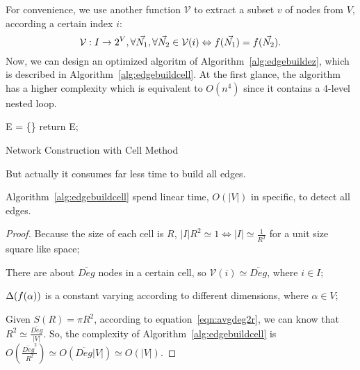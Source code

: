 \documentclass[prodmode,acmtecs]{acmsmall} %
\begin{document}
For convenience, we use another function $\mathcal{V}$ to extract a subset $v$ of nodes from $V$, according a certain index $i$:
\begin{equation}
\mathcal{V}:I \to 2^V, \forall\vec{N_1},\forall\vec{N_2} \in \mathcal{V}(i) \Leftrightarrow \mathnormal{f}(\vec{N_1}) = \mathnormal{f}(\vec{N_2}).
\end{equation}
Now, we can design an optimized algoritm of Algorithm~\ref{alg:edgebuildez}, which is described in Algorithm~\ref{alg:edgebuildcell}. At the first glance, the algorithm has a higher complexity which is equivalent to $O(n^4)$ since it contains a 4-level nested loop. 
\begin{algorithm}[t]
\SetAlgoNoLine
{}
E = \{\}\;
return E;
\caption{Network Construction with Cell Method}
\label{alg:edgebuildcell}
\end{algorithm}

But actually it consumes far less time to build all edges.
\begin{lemma}
Algorithm~\ref{alg:edgebuildcell} spend linear time, $O(|V|)$ in specific, to detect all edges.
\end{lemma}
\begin{proof}

Because the size of each cell is $R$, $|I|R^2 \simeq 1 \Leftrightarrow |I| \simeq \frac{1}{R^2}$ for a unit size square like space;

There are about $\overline{Deg}$ nodes in a certain cell, so ${\mathcal{V}(i)} \simeq \overline{Deg}$, where $i \in I$;

$\Delta(\mathnormal{f}(\alpha))$ is a constant varying according to different dimensions, where $ \alpha \in V$;

Given $S(R) = \pi R^2$, according to  equation~\ref{eqn:avgdeg2r}, we can know that $R^2 \simeq \frac{\overline{Deg}}{|V|}$.
So, the complexity of Algorithm~\ref{alg:edgebuildcell} is $O(\frac{\overline{Deg}^2}{R^2}) \simeq O(\overline{Deg}|V|) \simeq O(|V|)$.
\end{proof}
\end{document}
